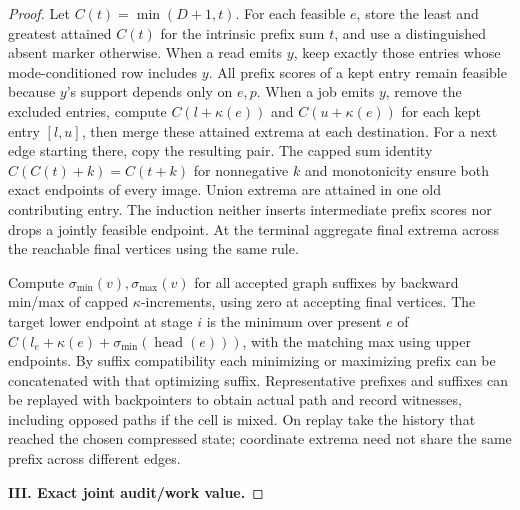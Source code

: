\begin{proof}
Let \(C(t)=\min(D+1,t)\). For each feasible \(e\), store the least and greatest attained \(C(t)\) for the intrinsic prefix sum \(t\), and use a distinguished absent marker otherwise. When a read emits \(y\), keep exactly those entries whose mode-conditioned row includes \(y\). All prefix scores of a kept entry remain feasible because \(y\)'s support depends only on \(e,p\). When a job emits \(y\), remove the excluded entries, compute \(C(l+\kappa(e))\) and \(C(u+\kappa(e))\) for each kept entry \([l,u]\), then merge these attained extrema at each destination. For a next edge starting there, copy the resulting pair. The capped sum identity \(C(C(t)+k)=C(t+k)\) for nonnegative \(k\) and monotonicity ensure both exact endpoints of every image. Union extrema are attained in one old contributing entry. The induction neither inserts intermediate prefix scores nor drops a jointly feasible endpoint. At the terminal aggregate final extrema across the reachable final vertices using the same rule.

Compute \(\sigma_{\min}(v),\sigma_{\max}(v)\) for all accepted graph suffixes by backward min/max of capped \(\kappa\)-increments, using zero at accepting final vertices. The target lower endpoint at stage \(i\) is the minimum over present \(e\) of \(C(l_e+\kappa(e)+\sigma_{\min}(\operatorname{head}(e)))\), with the matching max using upper endpoints. By suffix compatibility each minimizing or maximizing prefix can be concatenated with that optimizing suffix. Representative prefixes and suffixes can be replayed with backpointers to obtain actual path and record witnesses, including opposed paths if the cell is mixed. On replay take the history that reached the chosen compressed state; coordinate extrema need not share the same prefix across different edges.

\textbf{III. Exact joint audit/work value.}


\end{proof}
